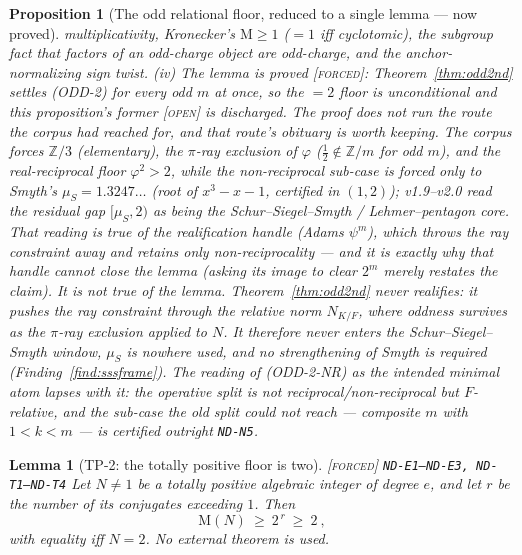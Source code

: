 \documentclass[11pt]{article}
\newcommand{\tagF}{\textcolor{cF}{\textsc{[forced]}}}
\newcommand{\tagO}{\textcolor{cO}{\textsc{[open]}}}
\newcommand{\hx}[1]{\textcolor{cC}{\footnotesize\texttt{#1}}}
\newcommand{\Z}{\mathbb{Z}}
\newcommand{\gp}{\varphi}
\newcommand{\M}{\mathrm{M}}
\theoremstyle{plain}
\newtheorem{proposition}[theorem]{Proposition}
\newtheorem{lemma}[theorem]{Lemma}
\theoremstyle{definition}
\theoremstyle{remark}
\begin{document}
\begin{proposition}[The odd relational floor, reduced to a single lemma --- now proved]
multiplicativity, Kronecker's $\M\ge1$ (${=}1$ iff cyclotomic), the subgroup fact
that factors of an odd-charge object are odd-charge, and the anchor-normalizing
sign twist. \emph{(iv) The lemma is proved} \tagF{}: Theorem~\ref{thm:odd2nd} settles
(ODD-2) for every odd $m$ at once, so the $=2$ floor is unconditional and this
proposition's former \tagO{} is discharged. The proof does \emph{not} run the
route the corpus had reached for, and that route's obituary is worth keeping.
The corpus forces $\Z/3$ (elementary), the $\pi$-ray exclusion of $\gp$
($\tfrac12\notin\Z/m$ for odd $m$), and the real-reciprocal floor $\gp^2>2$,
while the non-reciprocal sub-case is forced only to Smyth's
$\mu_S=1.3247\ldots$ (root of $x^3-x-1$, certified in $(1,2)$); v1.9--v2.0 read
the residual gap $[\mu_S,2)$ as \emph{being} the Schur--Siegel--Smyth /
Lehmer--pentagon core. That reading is true of the \emph{realification} handle
(Adams $\psi^m$), which throws the ray constraint away and retains only
non-reciprocality --- and it is exactly why that handle cannot close the lemma
(asking its image to clear $2^m$ merely restates the claim). It is \emph{not}
true of the lemma. Theorem~\ref{thm:odd2nd} never realifies: it pushes the ray
constraint through the relative norm $N_{K/F}$, where oddness survives as the
$\pi$-ray exclusion applied to $N$. It therefore never enters the
Schur--Siegel--Smyth window, $\mu_S$ is nowhere used, and no strengthening of
Smyth is required (Finding~\ref{find:sssframe}). The reading of (ODD-2-NR) as
the intended minimal atom lapses with it: the operative split is not
reciprocal/non-reciprocal but $F$-relative, and the sub-case the old split could
not reach --- composite $m$ with $1<k<m$ --- is certified outright \hx{ND-N5}.
\end{proposition}

\begin{lemma}[TP-2: the totally positive floor is two]\label{lem:tp2}\tagF{} \hx{ND-E1--ND-E3, ND-T1--ND-T4}
Let $N\neq1$ be a totally positive algebraic integer of degree $e$, and let $r$
be the number of its conjugates exceeding $1$. Then
\[
\boxed{\ \M(N)\ \ge\ 2^{\,r}\ \ge\ 2\ },
\]
with equality iff $N=2$. No external theorem is used.
\end{lemma}
\end{document}
